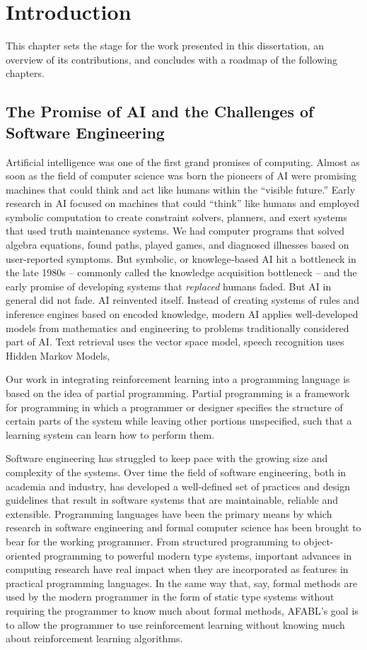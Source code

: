 \chapter{Introduction}

This chapter sets the stage for the work presented in this dissertation, an overview of its contributions, and concludes with a roadmap of the following chapters.

\section{The Promise of AI and the Challenges of Software Engineering}

Artificial intelligence was one of the first grand promises of computing. Almost as soon as the field of computer science was born the pioneers of AI were promising machines that could think and act like humans within the ``visible future.'' Early research in AI focused on machines that could ``think'' like humans and employed symbolic computation to create constraint solvers, planners, and exert systems that used truth maintenance systems. We had computer programs that solved algebra equations, found paths, played games, and diagnosed illnesses based on user-reported symptoms. But symbolic, or knowlege-based AI hit a bottleneck in the late 1980s -- commonly called the knowledge acquisition bottleneck -- and the early promise of developing systems that {\it replaced} humans faded. But AI in general did not fade. AI reinvented itself. Instead of creating systems of rules and inference engines based on encoded knowledge, modern AI applies well-developed models from mathematics and engineering to problems traditionally considered part of AI. Text retrieval uses the vector space model, speech recognition uses Hidden Markov Models,

Our work in integrating reinforcement learning into a programming language is based on the idea of partial programming. Partial programming is a framework for programming in which a programmer or designer specifies the structure of certain parts of the system while leaving other portions unspecified, such that a learning system can learn how to perform them.


Software engineering has struggled to keep pace with the growing size and complexity of the systems. Over time the field of software engineering, both in academia and industry, has developed a well-defined set of practices and design guidelines that result in software systems that are maintainable, reliable and extensible. Programming languages have been the primary means by which research in software engineering and formal computer science has been brought to bear for the working programmer. From structured programming to object-oriented programming to powerful modern type systems, important advances in computing research have real impact when they are incorporated as features in practical programming languages. In the same way that, say, formal methods are used by the modern programmer in the form of static type systems without requiring the programmer to know much about formal methods, AFABL's goal is to allow the programmer to use reinforcement learning without knowing much about reinforcement learning algorithms.

